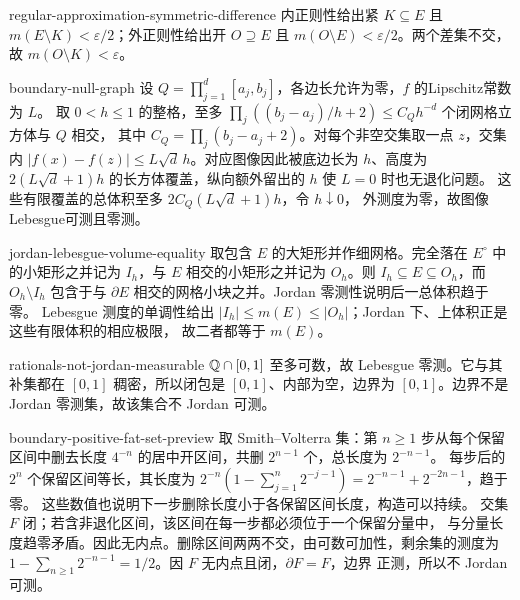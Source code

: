 \begin{solution}{regular-approximation-symmetric-difference}
内正则性给出紧 $K\subseteq E$ 且
$m(E\setminus K)<\varepsilon/2$；外正则性给出开 $O\supseteq E$ 且
$m(O\setminus E)<\varepsilon/2$。两个差集不交，故
$m(O\setminus K)<\varepsilon$。
\end{solution}

\begin{solution}{boundary-null-graph}
设 $Q=\prod_{j=1}^d[a_j,b_j]$，各边长允许为零，$f$ 的Lipschitz常数为 $L$。
取 $0<h\le1$ 的整格，至多
$\prod_j((b_j-a_j)/h+2)\le C_Qh^{-d}$ 个闭网格立方体与 $Q$ 相交，
其中 $C_Q=\prod_j(b_j-a_j+2)$。对每个非空交集取一点 $z$，交集内
$|f(x)-f(z)|\le L\sqrt d\,h$。对应图像因此被底边长为 $h$、高度为
$2(L\sqrt d+1)h$ 的长方体覆盖，纵向额外留出的 $h$ 使 $L=0$ 时也无退化问题。
这些有限覆盖的总体积至多 $2C_Q(L\sqrt d+1)h$，令 $h\downarrow0$，
外测度为零，故图像Lebesgue可测且零测。
\end{solution}

\begin{solution}{jordan-lebesgue-volume-equality}
取包含 $E$ 的大矩形并作细网格。完全落在 $E^\circ$ 中的小矩形之并记为
$I_h$，与 $E$ 相交的小矩形之并记为 $O_h$。则
$I_h\subseteq E\subseteq O_h$，而 $O_h\setminus I_h$ 包含于与
$\partial E$ 相交的网格小块之并。Jordan 零测性说明后一总体积趋于零。
Lebesgue 测度的单调性给出
$|I_h|\le m(E)\le|O_h|$；Jordan 下、上体积正是这些有限体积的相应极限，
故二者都等于 $m(E)$。
\end{solution}

\begin{solution}{rationals-not-jordan-measurable}
$\mathbb{Q}\cap[0,1]$ 至多可数，故 Lebesgue 零测。它与其补集都在 $[0,1]$
稠密，所以闭包是 $[0,1]$、内部为空，边界为 $[0,1]$。边界不是 Jordan
零测集，故该集合不 Jordan 可测。
\end{solution}

\begin{solution}{boundary-positive-fat-set-preview}
取 Smith--Volterra 集：第 $n\ge1$ 步从每个保留区间中删去长度 $4^{-n}$
的居中开区间，共删 $2^{n-1}$ 个，总长度为 $2^{-n-1}$。
每步后的 $2^n$ 个保留区间等长，其长度为
$2^{-n}(1-\sum_{j=1}^n2^{-j-1})=2^{-n-1}+2^{-2n-1}$，趋于零。
这些数值也说明下一步删除长度小于各保留区间长度，构造可以持续。
交集 $F$ 闭；若含非退化区间，该区间在每一步都必须位于一个保留分量中，
与分量长度趋零矛盾。因此无内点。删除区间两两不交，由可数可加性，剩余集的测度为
$1-\sum_{n\ge1}2^{-n-1}=1/2$。因 $F$ 无内点且闭，$\partial F=F$，边界
正测，所以不 Jordan 可测。
\end{solution}

